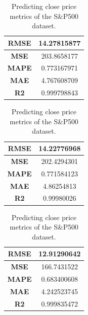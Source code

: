 \begin{table}[H]
	\centering
	\begin{minipage}{0.3\textwidth}
		\centering
		\begin{tabular}{|c|c|}
			\hline
			\textbf{RMSE} & 14.27815877 \\
			\hline
			\textbf{MSE}  & 203.8658177 \\
			\hline
			\textbf{MAPE} & 0.773167971 \\
			\hline
			\textbf{MAE}  & 4.767608709 \\
			\hline
			\textbf{R2}   & 0.999798843 \\
			\hline
		\end{tabular}
	\end{minipage}
	\begin{minipage}{0.3\textwidth}
		\centering
		\begin{tabular}{|c|c|}
			\hline
			\textbf{RMSE} & 14.22776968 \\
			\hline
			\textbf{MSE}  & 202.4294301 \\
			\hline
			\textbf{MAPE} & 0.771584123 \\
			\hline
			\textbf{MAE}  & 4.86254813  \\
			\hline
			\textbf{R2}   & 0.99980026  \\
			\hline
		\end{tabular}
	\end{minipage}
	\begin{minipage}{0.3\textwidth}
		\centering
		\begin{tabular}{|c|c|}
			\hline
			\textbf{RMSE} & 12.91290642 \\
			\hline
			\textbf{MSE}  & 166.7431522 \\
			\hline
			\textbf{MAPE} & 0.683400608 \\
			\hline
			\textbf{MAE}  & 4.242523745 \\
			\hline
			\textbf{R2}   & 0.999835472 \\
			\hline
		\end{tabular}
	\end{minipage}
	\caption{Predicting close price metrics of the S\&P500 dataset.}
	\label{metric:sp_close}
\end{table}
